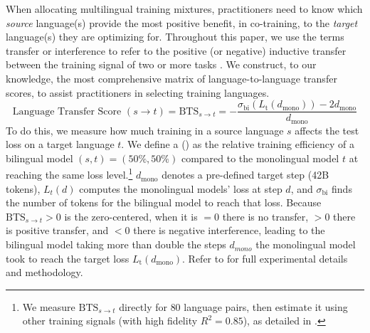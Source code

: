When allocating multilingual training mixtures, practitioners need to know which \emph{source} language(s) provide the most positive benefit, in co-training, to the \emph{target} language(s) they are optimizing for.
Throughout this paper, we use the terms transfer or interference to refer to the positive (or negative) inductive transfer between the training signal of two or more tasks \citep{caruana1997multitask}. 
We construct, to our knowledge, the most comprehensive matrix of language-to-language transfer scores, to assist practitioners in selecting training languages.
\[
\text{Language Transfer Score}\,\, (s \rightarrow t) = \mathrm{BTS}_{s\!\rightarrow t}  = - \frac{\sigma_{\text{bi}}(L_{\text{t}}(d_{\mathrm{mono}})) - 2d_{\mathrm{mono}}}{d_{\mathrm{mono}}}
\]
To do this, we measure how much training in a source language $s$ affects the test loss on a target language $t$. 
We define a \bts{} (\btsabb) as the relative training efficiency of a bilingual model $(s,t)=(50\%,50\%)$ compared to the monolingual model $t$ at reaching the same loss level.\footnote{We measure $\mathrm{BTS}_{s\!\rightarrow t}$ directly for $80$ language pairs, then estimate it using other training signals (with high fidelity $R^2=0.85$), as detailed in .}
$d_{\mathrm{mono}}$ denotes a pre-defined target step (42B tokens), $L_{t}(d)$ computes the monolingual models' loss at step $d$, and $\sigma_{\text{bi}}$ finds the number of tokens for the bilingual model to reach that loss.
Because $\mathrm{BTS}_{s\!\rightarrow t}>0$ is the zero-centered, when it is $=0$ there is no transfer, $>0$ there is positive transfer, and $<0$ there is negative interference, leading to the bilingual model taking more than double the steps $d_{mono}$ the monolingual model took to reach the target loss $L_{\text{t}}(d_{\mathrm{mono}})$.
Refer to  for full experimental details and methodology.

